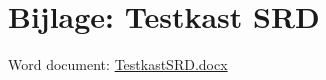 \appendix

\section{Bijlage: Testkast SRD} \label{sec:TestKastSRD}

Word document: \href{run:TestkastSRD.docx}{TestkastSRD.docx}